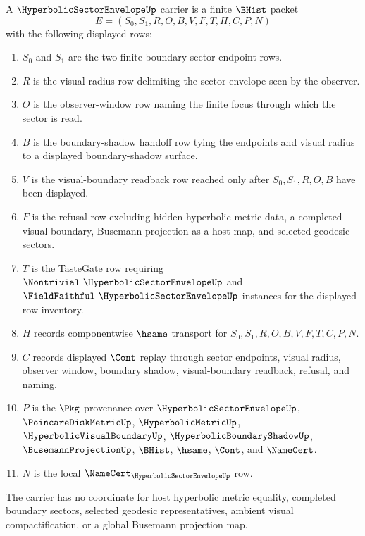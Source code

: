 \begin{definition}
\label{def:hyperbolic-sector-envelope-carrier}
A $\HyperbolicSectorEnvelopeUp$ carrier is a finite $\BHist$ packet
$$
E=(S_0,S_1,R,O,B,V,F,T,H,C,P,N)
$$
with the following displayed rows:
\begin{enumerate}
\item $S_0$ and $S_1$ are the two finite boundary-sector endpoint rows.
\item $R$ is the visual-radius row delimiting the sector envelope seen by the observer.
\item $O$ is the observer-window row naming the finite focus through which the sector is read.
\item $B$ is the boundary-shadow handoff row tying the endpoints and visual radius to a displayed boundary-shadow surface.
\item $V$ is the visual-boundary readback row reached only after $S_0,S_1,R,O,B$ have been displayed.
\item $F$ is the refusal row excluding hidden hyperbolic metric data, a completed visual boundary, Busemann projection as a host map, and selected geodesic sectors.
\item $T$ is the TasteGate row requiring $\Nontrivial\ \HyperbolicSectorEnvelopeUp$ and $\FieldFaithful\ \HyperbolicSectorEnvelopeUp$ instances for the displayed row inventory.
\item $H$ records componentwise $\hsame$ transport for $S_0,S_1,R,O,B,V,F,T,C,P,N$.
\item $C$ records displayed $\Cont$ replay through sector endpoints, visual radius, observer window, boundary shadow, visual-boundary readback, refusal, and naming.
\item $P$ is the $\Pkg$ provenance over $\HyperbolicSectorEnvelopeUp$, $\PoincareDiskMetricUp$, $\HyperbolicMetricUp$, $\HyperbolicVisualBoundaryUp$, $\HyperbolicBoundaryShadowUp$, $\BusemannProjectionUp$, $\BHist$, $\hsame$, $\Cont$, and $\NameCert$.
\item $N$ is the local $\NameCert_{\HyperbolicSectorEnvelopeUp}$ row.
\end{enumerate}
The carrier has no coordinate for host hyperbolic metric equality, completed boundary sectors, selected geodesic representatives, ambient visual compactification, or a global Busemann projection map.
\end{definition}

